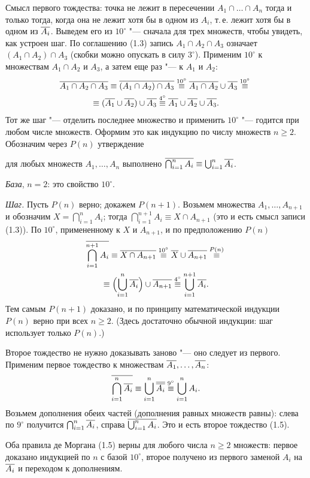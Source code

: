 \begin{solution}[4 (\S\,1)]
Смысл первого тождества: точка не лежит в пересечении $A_1\cap\dots\cap A_n$
тогда и только тогда, когда она не лежит хотя бы в одном из $A_i$, т.\,е.
лежит хотя бы в одном из $\overline{A_i}$. Выведем его из $10^\circ$ "--- сначала
для трех множеств, чтобы увидеть, как устроен шаг. По соглашению (1.3)
запись $A_1\cap A_2\cap A_3$ означает $(A_1\cap A_2)\cap A_3$ (скобки можно
опускать в силу $3^\circ$). Применим $10^\circ$ к множествам $A_1\cap A_2$
и $A_3$, а затем еще раз "--- к $A_1$ и $A_2$:
\begin{multline*}
\overline{A_1\cap A_2\cap A_3}\equiv\overline{(A_1\cap A_2)\cap A_3}
\overset{10^\circ}{\equiv}\overline{A_1\cap A_2}\cup\overline{A_3}\overset{10^\circ}{\equiv}{}\\
\equiv(\overline{A_1}\cup\overline{A_2})\cup\overline{A_3}\overset{4^\circ}{\equiv}
\overline{A_1}\cup\overline{A_2}\cup\overline{A_3}.
\end{multline*}
Тот же шаг "--- отделить последнее множество и применить $10^\circ$ "---
годится при любом числе множеств. Оформим это как индукцию по числу
множеств $n\ge2$. Обозначим через $P(n)$ утверждение
\begin{keystmt}
для любых множеств $A_1,\dots,A_n$ выполнено
$\overline{\bigcap_{i=1}^{n}A_i}\equiv\bigcup_{i=1}^{n}\overline{A_i}$.
\end{keystmt}

\emph{База}, $n=2$: это свойство $10^\circ$.

\emph{Шаг.} Пусть $P(n)$ верно; докажем $P(n+1)$. Возьмем множества
$A_1,\dots,A_{n+1}$ и обозначим $X=\bigcap_{i=1}^{n}A_i$; тогда
$\bigcap_{i=1}^{n+1}A_i\equiv X\cap A_{n+1}$ (это и есть смысл записи
(1.3)). По $10^\circ$, примененному к $X$ и $A_{n+1}$, и по
предположению $P(n)$
\begin{multline*}
\overline{\bigcap_{i=1}^{n+1}A_i}\equiv\overline{X\cap A_{n+1}}\overset{10^\circ}{\equiv}
\overline{X}\cup\overline{A_{n+1}}\overset{P(n)}{\equiv}{}\\
\equiv\Bigl(\bigcup_{i=1}^{n}\overline{A_i}\Bigr)\cup\overline{A_{n+1}}
\overset{4^\circ}{\equiv}\bigcup_{i=1}^{n+1}\overline{A_i}.
\end{multline*}
Тем самым $P(n+1)$ доказано, и по принципу математической индукции $P(n)$
верно при всех $n\ge2$. (Здесь достаточно обычной индукции: шаг
использует только $P(n)$.)

Второе тождество не нужно доказывать заново "--- оно следует из первого.
Применим первое тождество к множествам $\overline{A_1},\dots,\overline{A_n}$:
\[
\overline{\bigcap_{i=1}^{n}\overline{A_i}}\equiv\bigcup_{i=1}^{n}\overline{\overline{A_i}}
\overset{9^\circ}{\equiv}\bigcup_{i=1}^{n}A_i .
\]
Возьмем дополнения обеих частей (дополнения равных множеств равны): слева
по $9^\circ$ получится $\bigcap_{i=1}^{n}\overline{A_i}$, справа
$\overline{\bigcup_{i=1}^{n}A_i}$. Это и есть второе тождество (1.5).

\answer Оба правила де Моргана (1.5) верны для любого числа $n\ge2$
множеств: первое доказано индукцией по $n$ с базой $10^\circ$, второе
получено из первого заменой $A_i$ на $\overline{A_i}$ и переходом
к дополнениям.
\end{solution}
